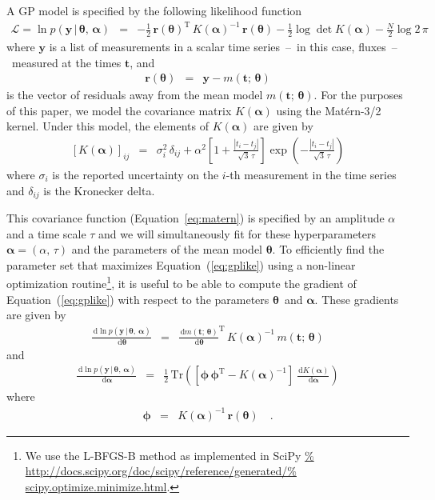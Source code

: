 \documentclass[manuscript, letterpaper]{aastex6}
\renewcommand{\eqref}[1]{\ref{eq:#1}}
\newcommand{\Eq}[1]{Equation~(\eqref{#1})}
\newcommand{\eq}[1]{\Eq{#1}}
\newcommand{\eqalt}[1]{Equation~\eqref{#1}}
\newcommand{\eqlabel}[1]{\label{eq:#1}}
\newcommand{\T}{\ensuremath{\mathrm{T}}}
\newcommand{\dd}{\ensuremath{\,\mathrm{d}}}
\newcommand{\bvec}[1]{{\ensuremath{\boldsymbol{#1}}}}
\newcommand{\meanpars}{{\ensuremath{\bvec{\theta}}}}
\newcommand{\kernpars}{{\ensuremath{\bvec{\alpha}}}}
\begin{document}
A GP model is specified by the following likelihood function
\begin{eqnarray}\eqlabel{gplike}
\mathcal{L} = \ln p(\bvec{y}\,|\,\meanpars,\,\kernpars) &=&
- \frac{1}{2}\,\bvec{r}(\meanpars)^\T\,K(\kernpars)^{-1}\,
    \bvec{r}(\meanpars)
- \frac{1}{2}\log\det K(\kernpars) - \frac{N}{2} \log{2\,\pi}
\end{eqnarray}
where \bvec{y} is a list of measurements in a scalar time series~--~in this
case, fluxes~--~measured at the times \bvec{t}, and
\begin{eqnarray}
\bvec{r}(\meanpars) &=& \bvec{y} - m(\bvec{t};\,\meanpars)
\end{eqnarray}
is the vector of residuals away from the mean model $m(\bvec{t};\,\meanpars)$.
For the purposes of this paper, we model the covariance matrix $K(\kernpars)$
using the Mat\'ern-3/2 kernel.
Under this model, the elements of $K(\kernpars)$ are given by
\begin{eqnarray}\eqlabel{matern}
\left[ K(\kernpars) \right]_{ij} &=& \sigma_i^2\,\delta_{ij}
    + \alpha^2 \left[ 1+\frac{|t_i - t_j|}{\sqrt{3}\,\tau} \right]
      \exp \left(-\frac{|t_i - t_j|}{\sqrt{3}\,\tau}\right)
\end{eqnarray}
where $\sigma_i$ is the reported uncertainty on the $i$-th measurement in the
time series and $\delta_{ij}$ is the Kronecker delta.

This covariance function (\eqalt{matern}) is specified by an amplitude
$\alpha$ and a time scale $\tau$ and we will simultaneously fit for these
hyperparameters $\kernpars=(\alpha,\,\tau)$ and the parameters of the mean
model \meanpars.
To efficiently find the parameter set that maximizes \eq{gplike} using a
non-linear optimization routine\footnote{We use the L-BFGS-B method as
implemented in SciPy \url{%
http://docs.scipy.org/doc/scipy/reference/generated/%
scipy.optimize.minimize.html}.},
it is useful to be able to compute the gradient of \eq{gplike} with respect to
the parameters \meanpars\ and \kernpars.
These gradients are given by
\begin{eqnarray}\eqlabel{gpmeangrad}
\frac{\dd\ln p(\bvec{y}\,|\,\meanpars,\,\kernpars)}{\dd \meanpars} &=&
\frac{\dd m(\bvec{t};\,\meanpars)}{\dd\meanpars}^\T \, K(\kernpars)^{-1} \,
    m(\bvec{t};\,\meanpars)
\end{eqnarray}
and
\begin{eqnarray}
\frac{\dd\ln p(\bvec{y}\,|\,\meanpars,\,\kernpars)}{\dd \kernpars} &=&
\frac{1}{2}\,\mathrm{Tr}\left(
    \left[ \bvec{\phi}\,\bvec{\phi}^\T - K(\kernpars)^{-1} \right]
    \,\frac{\dd K(\kernpars)}{\dd\kernpars}
\right)
\end{eqnarray}
where
\begin{eqnarray}
\bvec{\phi} &=& K(\kernpars)^{-1}\,\bvec{r}(\meanpars) \quad.
\end{eqnarray}




\end{document}
